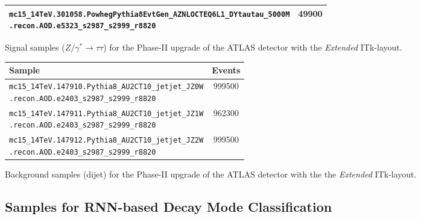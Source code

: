 \begin{minipage}{\textwidth}
{\begin{tabular}{p{13cm}S[table-format=6.0]}
    \texttt{mc15\_14TeV.301058.PowhegPythia8EvtGen\_AZNLOCTEQ6L1\_DYtautau\_5000M\newline\hspace*{1em}.recon.AOD.e5323\_s2987\_s2999\_r8820} & 49900 \\
    \bottomrule
  \end{tabular}
  }
  \caption[Signal samples for the Phase-II upgrade of the ATLAS detector]{Signal
    samples ($Z / \gamma^* \to \tau\tau$) for the Phase-II upgrade of the ATLAS
    detector with the \emph{Extended} ITk-layout.}
  \label{tab:samples_upgrade_tau}
\end{minipage}

\clearpage

\noindent
\begin{minipage}{\textwidth}
  \captionsetup{type=table}
  \centering
  {\small
  \begin{tabular}{p{13cm}S[table-format=6.0]}
    \toprule
    Sample & {Events} \\
    \midrule
    \texttt{mc15\_14TeV.147910.Pythia8\_AU2CT10\_jetjet\_JZ0W\newline\hspace*{1em}.recon.AOD.e2403\_s2987\_s2999\_r8820} & 999500 \\
    \texttt{mc15\_14TeV.147911.Pythia8\_AU2CT10\_jetjet\_JZ1W\newline\hspace*{1em}.recon.AOD.e2403\_s2987\_s2999\_r8820} & 962300 \\
    \texttt{mc15\_14TeV.147912.Pythia8\_AU2CT10\_jetjet\_JZ2W\newline\hspace*{1em}.recon.AOD.e2403\_s2987\_s2999\_r8820} & 999500 \\
    \bottomrule
  \end{tabular}
  }
  \caption[Background samples for the Phase-II upgrade of the ATLAS
  detector]{Background samples (dijet) for the Phase-II upgrade of the ATLAS
    detector with the the \emph{Extended} ITk-layout.}
  \label{tab:samples_upgrade_dijet}
\end{minipage}

\vspace*{2em}

\FloatBarrier
\subsection{Samples for RNN-based Decay Mode Classification}
\label{app:mc16a_taus}

